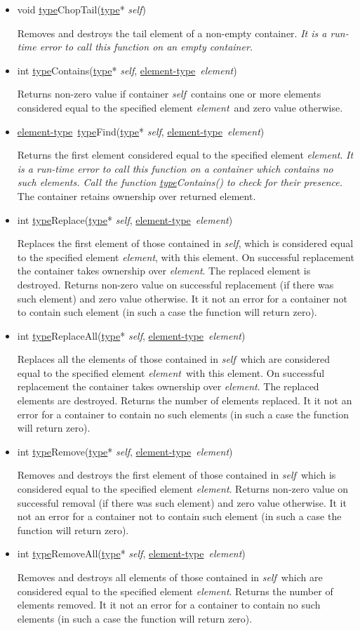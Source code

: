 \documentclass[a4paper]{article}
\newcommand{\st}{\underline{type}}
\newcommand{\et}{\underline{element-type}}
\newcommand{\sv}{\emph{self}}
\newcommand{\ev}{\emph{element}}
\newcommand{\meth}[1]{#1}
\begin{document}
\begin{itemize}
\item \meth{void \st ChopTail(\st* \sv)}


Removes and destroys the tail element of a non-empty container.
\emph{It is a run-time error to call this function on an empty container.}


\item \meth{int \st Contains(\st* \sv, \et\ \ev)}


Returns non-zero value if container \sv\ contains one or more elements considered equal to the specified element \ev\ and zero value otherwise.


\item \meth{\et\ \st Find(\st* \sv, \et\ \ev)}


Returns the first element considered equal to the specified element \ev.
\emph{It is a run-time error to call this function on a container which contains no such elements. Call the function \meth{\st Contains()} to check for their presence.}
The container retains ownership over returned element.


\item \meth{int \st Replace(\st* \sv, \et\ \ev)}


Replaces the first element of those contained in \sv, which is considered equal to the specified element \ev, with this element.
On successful replacement the container takes ownership over \ev.
The replaced element is destroyed.
Returns non-zero value on successful replacement (if there was such element) and zero value otherwise.
It it not an error for a container not to contain such element (in such a case the function will return zero).


\item \meth{int \st ReplaceAll(\st* \sv, \et\ \ev)}


Replaces all the elements of those contained in \sv\ which are considered equal to the specified element \ev\ with this element.
On successful replacement the container takes ownership over \ev.
The replaced elements are destroyed.
Returns the number of elements replaced.
It it not an error for a container to contain no such elements (in such a case the function will return zero).


\item \meth{int \st Remove(\st* \sv, \et\ \ev)}


Removes and destroys the first element of those contained in \sv\ which is considered equal to the specified element \ev.
Returns non-zero value on successful removal (if there was such element) and zero value otherwise.
It it not an error for a container not to contain such element (in such a case the function will return zero).


\item \meth{int \st RemoveAll(\st* \sv, \et\ \ev)}


Removes and destroys all elements of those contained in \sv\ which are considered equal to the specified element \ev.
Returns the number of elements removed.
It it not an error for a container to contain no such elements (in such a case the function will return zero).


\end{itemize}
\end{document}
